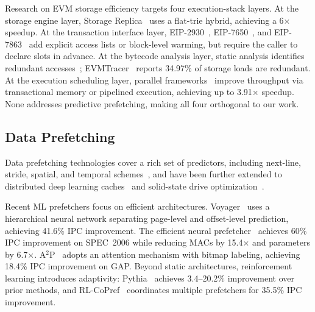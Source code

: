 \documentclass[conference]{IEEEtran}
\begin{document}
Research on EVM storage efficiency targets four execution-stack layers. At the storage engine layer, Storage Replica~\cite{storage_replica} uses a flat-trie hybrid, achieving a 6$\times$ speedup. At the transaction interface layer, EIP-2930~\cite{eip2930}, EIP-7650~\cite{eip7650}, and EIP-7863~\cite{eip7863} add explicit access lists or block-level warming, but require the caller to declare slots in advance. At the bytecode analysis layer, static analysis identifies redundant accesses~\cite{needless_writes,evmtracer,evmshield}; EVMTracer~\cite{evmtracer} reports 34.97\% of storage loads are redundant. At the execution scheduling layer, parallel frameworks~\cite{ostm,reddio,conflict_spec} improve throughput via transactional memory or pipelined execution, achieving up to 3.91$\times$ speedup. None addresses predictive prefetching, making all four orthogonal to our work.

\subsection{Data Prefetching}
\label{sec:data-prefetching}


Data prefetching technologies cover a rich set of predictors, including next-line, stride, spatial, and temporal schemes~\cite{primer_prefetch,survey_prefetch,markov_prefetch}, and have been further extended to distributed deep learning caches~\cite{nas_paper_1} and solid-state drive optimization~\cite{nas_paper_2}.

Recent ML prefetchers focus on efficient architectures. Voyager~\cite{voyager} uses a hierarchical neural network separating page-level and offset-level prediction, achieving 41.6\% IPC improvement. The efficient neural prefetcher~\cite{efficient_neural} achieves 60\% IPC improvement on SPEC~2006 while reducing MACs by 15.4$\times$ and parameters by 6.7$\times$. A$^2$P~\cite{a2p} adopts an attention mechanism with bitmap labeling, achieving 18.4\% IPC improvement on GAP. Beyond static architectures, reinforcement learning introduces adaptivity: Pythia~\cite{pythia} achieves 3.4--20.2\% improvement over prior methods, and RL-CoPref~\cite{rlcopref} coordinates multiple prefetchers for 35.5\% IPC improvement.
\end{document}
